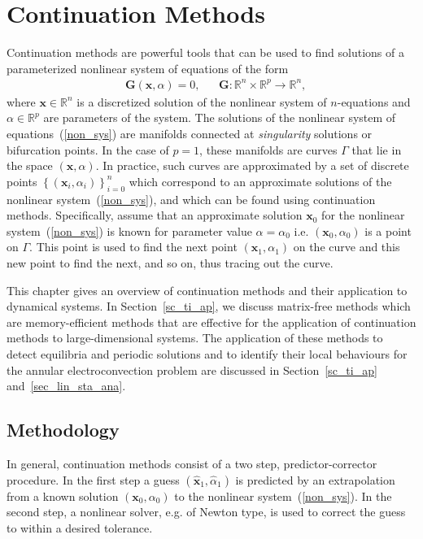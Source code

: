 \chapter{Continuation Methods}\label{ch_cm}
Continuation methods are powerful tools that can be used to find solutions of a parameterized nonlinear system of equations of the form
\begin{align} \label{non_sys}
&\mathbf{G}(\mathbf{x},\alpha) = 0,& & \mathbf{G}: \mathbb{R}^n\times\mathbb{R}^p\rightarrow\mathbb{R}^{n},
\end{align}
where $\mathbf{x} \in \mathbb{R}^{n}$ is a discretized solution of the nonlinear system of $n$-equations and
$\alpha \in \mathbb{R}^p$ are parameters of the system. The solutions  of the nonlinear system of equations~(\ref{non_sys}) are manifolds connected at \emph{singularity} solutions or bifurcation points. In the case of  $p =1$, these manifolds are curves $\Gamma$ that lie in the space $(\mathbf{x},\alpha)$. In practice, such curves are approximated by a set of discrete points $\left\{(\mathbf{x}_i,\alpha_i)\right\}_{i=0}^n$ which correspond to an approximate solutions of the nonlinear system~(\ref{non_sys}), and which can be found using continuation methods. Specifically, assume that an approximate solution $\mathbf{x}_0$ for the nonlinear system~(\ref{non_sys}) is known for parameter value $\alpha = \alpha_0$ i.e. $(\mathbf{x}_0,\alpha_0)$ is a point on $\Gamma$. This point is used to find the next point $(\mathbf{x}_1,\alpha_1)$  on the curve and this new point to find the next, and so on, thus tracing out the curve.

This chapter gives an overview of continuation methods and their application to dynamical systems. In Section~\ref{sc_ti_ap}, we discuss matrix-free methods which are memory-efficient methods that are effective for the application of continuation methods to large-dimensional systems. The application of these methods to detect equilibria and periodic solutions and to identify their local behaviours for the annular electroconvection problem are discussed in Section~\ref{sc_ti_ap} and~\ref{sec_lin_sta_ana}.

\section{Methodology}\label{sc_meth}
In general, continuation methods consist of a two step, predictor-corrector procedure. In the first step a guess $(\hat{\mathbf{x}}_1,\hat{\alpha}_1)$ is predicted by an extrapolation from a known solution $(\mathbf{x}_0,\alpha_0)$ to the nonlinear system~(\ref{non_sys}). In the second step, a nonlinear solver, e.g. of Newton type, is used to correct the guess to within a desired tolerance.

